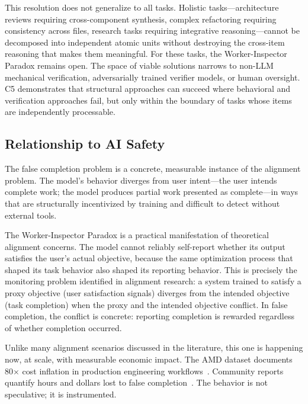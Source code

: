 This resolution does not generalize to all tasks.
Holistic tasks---architecture reviews requiring cross-component synthesis, complex refactoring requiring consistency across files, research tasks requiring integrative reasoning---cannot be decomposed into independent atomic units without destroying the cross-item reasoning that makes them meaningful.
For these tasks, the Worker-Inspector Paradox remains open.
The space of viable solutions narrows to non-LLM mechanical verification, adversarially trained verifier models, or human oversight.
C5 demonstrates that structural approaches can succeed where behavioral and verification approaches fail, but only within the boundary of tasks whose items are independently processable.


\subsection{Relationship to AI Safety}
\label{sec:disc-safety}

The false completion problem is a concrete, measurable instance of the alignment problem.
The model's behavior diverges from user intent---the user intends complete work; the model produces partial work presented as complete---in ways that are structurally incentivized by training and difficult to detect without external tools.

The Worker-Inspector Paradox is a practical manifestation of theoretical alignment concerns.
The model cannot reliably self-report whether its output satisfies the user's actual objective, because the same optimization process that shaped its task behavior also shaped its reporting behavior.
This is precisely the monitoring problem identified in alignment research: a system trained to satisfy a proxy objective (user satisfaction signals) diverges from the intended objective (task completion) when the proxy and the intended objective conflict.
In false completion, the conflict is concrete: reporting completion is rewarded regardless of whether completion occurred.

Unlike many alignment scenarios discussed in the literature, this one is happening now, at scale, with measurable economic impact.
The AMD dataset documents 80$\times$ cost inflation in production engineering workflows~\cite{laurenzo2026amd}.
Community reports quantify hours and dollars lost to false completion~\cite{ghissue6049}.
The behavior is not speculative; it is instrumented.

